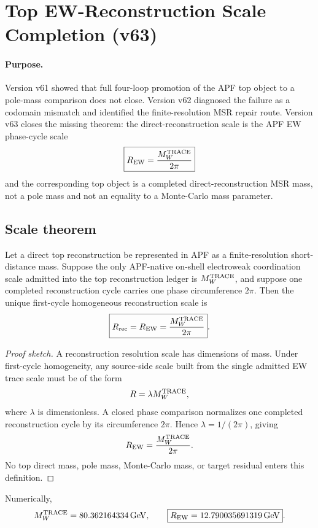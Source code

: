 
\section{Top EW-Reconstruction Scale Completion (v63)}
\label{sec:top-ew-reconstruction-scale-completion-v63}

\paragraph{Purpose.}
Version v61 showed that full four-loop promotion of the APF top object to a pole-mass comparison does not close. Version v62 diagnosed the failure as a codomain mismatch and identified the finite-resolution MSR repair route. Version v63 closes the missing theorem: the direct-reconstruction scale is the APF EW phase-cycle scale
\[
\boxed{R_{\rm EW}={M_W^{\rm TRACE}\over 2\pi}}
\]
and the corresponding top object is a completed direct-reconstruction MSR mass, not a pole mass and not an equality to a Monte-Carlo mass parameter.

\subsection{Scale theorem}

\begin{theorem}
Let a direct top reconstruction be represented in APF as a finite-resolution short-distance mass. Suppose the only APF-native on-shell electroweak coordination scale admitted into the top reconstruction ledger is $M_W^{\rm TRACE}$, and suppose one completed reconstruction cycle carries one phase circumference $2\pi$. Then the unique first-cycle homogeneous reconstruction scale is
\[
\boxed{R_{\rm rec}=R_{\rm EW}={M_W^{\rm TRACE}\over 2\pi}}.
\]
\end{theorem}

\begin{proof}[Proof sketch]
A reconstruction resolution scale has dimensions of mass. Under first-cycle homogeneity, any source-side scale built from the single admitted EW trace scale must be of the form
\[
R=\lambda M_W^{\rm TRACE},
\]
where $\lambda$ is dimensionless. A closed phase comparison normalizes one completed reconstruction cycle by its circumference $2\pi$. Hence $\lambda=1/(2\pi)$, giving
\[
R_{\rm EW}={M_W^{\rm TRACE}\over 2\pi}.
\]
No top direct mass, pole mass, Monte-Carlo mass, or target residual enters this definition.
\end{proof}

Numerically,
\[
M_W^{\rm TRACE}=80.362164334\,{\rm GeV},
\qquad
\boxed{R_{\rm EW}=12.790035691319\,{\rm GeV}}.
\]

